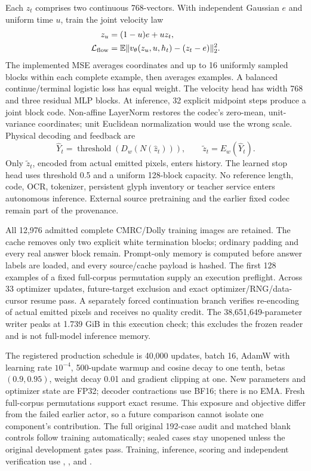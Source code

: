 \documentclass[10pt,a4paper]{article}
\begin{document}
Each $z_t$ comprises two continuous 768-vectors. With independent Gaussian
$e$ and uniform time $u$, train the joint velocity law
\begin{align}
 z_u&=(1-u)e+uz_t,\\
 \mathcal L_{\rm flow}&=\mathbb E\|v_\theta(z_u,u,h_t)-(z_t-e)\|_2^2.
\end{align}
The implemented MSE averages coordinates and up to 16 uniformly sampled
blocks within each complete example, then averages examples. A balanced
continue/terminal logistic loss has equal weight. The velocity head has width
768 and three residual MLP blocks. At inference, 32 explicit midpoint steps
produce a joint block code. Non-affine LayerNorm restores the codec's
zero-mean, unit-variance coordinates; unit Euclidean normalization would use
the wrong scale. Physical decoding and feedback are
\begin{equation}
 \widehat Y_t=\operatorname{threshold}(D_w(N(\widehat z_t))),
 \qquad \widetilde z_t=E_w(\widehat Y_t).
\end{equation}
Only $\widetilde z_t$, encoded from actual emitted pixels, enters history.
The learned stop head uses threshold 0.5 and a uniform 128-block capacity.
No reference length, code, OCR, tokenizer, persistent glyph inventory or
teacher service enters autonomous inference. External source pretraining and
the earlier fixed codec remain part of the provenance.

All 12,976 admitted complete CMRC/Dolly training images are retained. The
cache removes only two explicit white termination blocks; ordinary padding
and every real answer block remain. Prompt-only memory is computed before
answer labels are loaded, and every source/cache payload is hashed. The
first 128 examples of a fixed full-corpus permutation supply an execution
preflight. Across 33 optimizer updates, future-target exclusion and exact
optimizer/RNG/data-cursor resume pass. A separately forced continuation branch
verifies re-encoding of actual emitted pixels and receives no quality credit.
The 38,651,649-parameter writer peaks at 1.739 GiB in this execution check;
this excludes the frozen reader and is not full-model inference memory.

The registered production schedule is 40,000 updates, batch 16, AdamW with
learning rate $10^{-4}$, 500-update warmup and cosine decay to one tenth,
betas $(0.9,0.95)$, weight decay 0.01 and gradient clipping at one. New
parameters and optimizer state are FP32; decoder contractions use BF16;
there is no EMA. Fresh full-corpus permutations support exact resume. This
exposure and objective differ from the failed earlier actor, so a future
comparison cannot isolate one component's contribution. The full original
192-case audit and matched blank controls follow training automatically;
sealed cases stay unopened unless the original development gates pass.
Training, inference, scoring and independent verification use
,
,
 and
.
\end{document}
